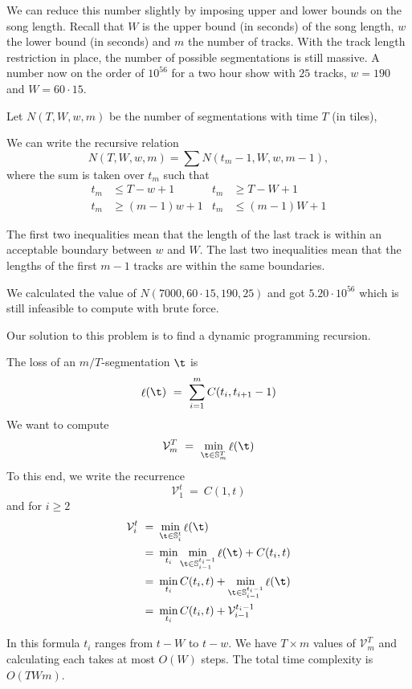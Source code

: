 \documentclass[twocolumn]{article}
\DeclareMathOperator{\loss}{\ell}
\newcommand{\segs}{\mathbb S}
\newcommand{\best}{\mathcal V}
\begin{document}
	We can reduce this number slightly by imposing upper and lower bounds on the song length.  Recall that $W$ is the upper bound (in seconds) of the song length, $w$ the lower bound (in seconds) and $m$ the number of tracks. With the track length restriction in place, the number of possible segmentations is still massive. A number now on the order of $10^{56}$ for a two hour show with $25$ tracks, $w=190$ and $W=60\cdot15$.
	
	Let $N(T,W,w,m)$ be the number of segmentations with time $T$ (in tiles),
	
	We can write the recursive relation $$N(T,W,w,m) = \sum N(t_m-1,W,w,m-1),$$ where the sum is taken over $t_m$ such that 
	\begin{align*}
		t_m &\le T-w+1 & t_m &\ge T-W+1\\
		t_m &\ge (m-1)w+1 & t_m &\le (m-1)W+1
	\end{align*}
	
	The first two inequalities mean that the length of the last track is within an acceptable boundary between $w$ and $W$. The last two inequalities mean that the lengths of the first $m-1$ tracks are within the same boundaries. 
	
	We calculated the value of $N(7000,60\cdot15,190,25)$ and got $5.20 \cdot 10^{56}$ which is still infeasible to compute with brute force.
	
	Our solution to this problem is to find a dynamic programming recursion.
	
	The loss of an $m/T$-segmentation $\t$ is 
	\[
	\loss(\t) 
	~=~
	\sum_{i=1}^m C(t_i, t_{i+1}-1)
	\]
	We want to compute
	\[
	\best^T_m ~=~ \min_{\t \in \segs^T_m} \loss(\t)
	\]
	To this end, we write the recurrence
	\begin{equation*}
		\best^t_1 ~=~ C(1, t) 
	\end{equation*}
	and for $i\ge2$
\begin{align*}
		\best^t_i ~=~& \min_{\t \in \segs^t_i} \loss(\t)  \\
		~=~& \min_{t_i} \min_{\t \in \segs^{t_i-1}_{i-1}} \loss(\t) + C(t_i, t)  \\
		~=~&  	\min_{t_i} C(t_i, t) + \min_{\t \in \segs^{t_i-1}_{i-1}} \loss(\t)  \\ 
		~=~& \min_{t_i} C(t_i, t) + \best^{t_i-1}_{i-1} \\
\end{align*}
	
	In this formula $t_i$ ranges from $t-W$ to $t-w$. We have $T \times m$ values of $\best^T_m$ and calculating each takes at most $O(W)$ steps. The total time complexity is $O(TWm)$.
	
\end{document}
